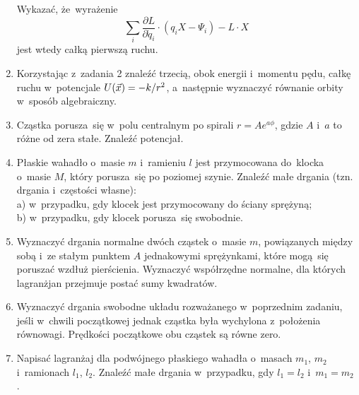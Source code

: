 \documentclass[a4paper,11pt]{article}
\begin{document}
\begin{enumerate}
  Wykazać, że~wyrażenie
  \begin{equation*}
    \sum_{ i } \frac{ \partial L }{ \partial \dot{q}_{ i } } \cdot ( q_{ i } X - \Psi_{ i } )
    - L \cdot X
  \end{equation*}
  jest wtedy całką pierwszą ruchu.



\item Korzystając z~zadania 2 znaleźć trzecią, obok energii i~momentu pędu,
  całkę ruchu w~potencjale $U( \vec{x} ) = -k / r^{ 2 }$, a~następnie
  wyznaczyć równanie orbity w~sposób algebraiczny.



\item Cząstka porusza~się w~polu centralnym po spirali
  $r = A e^{ a \phi }$, gdzie $A$ i~$a$ to różne od zera stałe. Znaleźć
  potencjał.



\item Płaskie wahadło o~masie $m$ i~ramieniu $l$ jest przymocowana do~klocka
  o~masie $M$, który porusza~się po poziomej szynie. Znaleźć małe drgania
  (tzn. drgania i~częstości własne): \\
  a) w~przypadku, gdy klocek jest przymocowany do ściany sprężyną; \\
  b) w~przypadku, gdy klocek porusza~się swobodnie.



\item Wyznaczyć drgania normalne dwóch cząstek o~masie $m$, powiązanych
  między sobą i~ze stałym punktem $A$ jednakowymi sprężynkami, które
  mogą~się poruszać wzdłuż pierścienia. Wyznaczyć współrzędne normalne,
  dla których lagranżjan przejmuje postać sumy kwadratów.



\item Wyznaczyć drgania swobodne układu rozważanego w~poprzednim zadaniu,
  jeśli w~chwili początkowej jednak cząstka była wychylona z~położenia
  równowagi. Prędkości początkowe obu cząstek są równe zero.



\item Napisać lagranżaj dla podwójnego płaskiego wahadła o~masach
  $m_{ 1 }$, $m_{ 2 }$ i~ramionach $l_{ 1 }$, $l_{ 2 }$. Znaleźć małe
  drgania w~przypadku, gdy $l_{ 1 } = l_{ 2 }$ i~$m_{ 1 } = m_{ 2 }$.




\end{enumerate}
\end{document}
